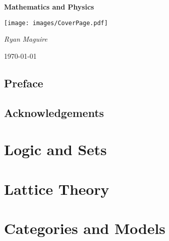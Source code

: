 \documentclass[oneside]{book}                                                  %
\newcommand*{\TOPPATH}{books}
\newcommand*{\PATH}{\TOPPATH/}
\newcounter{endpage}
\begin{document}
    \pagecolor{CoverPage}
    \begin{titlepage}
        \centering
        {\LARGE\bfseries{Mathematics and Physics}\par}
        \vspace{3.5cm}
        \texttt{[image: images/CoverPage.pdf]}
        \par\vspace{3cm}
        {\Large\itshape{Ryan Maguire}\par}
        \vfill
        {\large\today\par}
    \end{titlepage}
    \nopagecolor
    \tableofcontents
    \listoffigures
    \listoftables
    \clearpage
    \chapter*{Preface}
        
    \clearpage
    \chapter*{Acknowledgements}
        
    \clearpage

        \label{book:Foundations}
        \renewcommand{\PATH}{\TOPPATH/Foundations}
        \part{Logic and Sets}
            
        \part{Lattice Theory}
            
        \part{Categories and Models}
            
    \clearpage

    \setcounter{endpage}{\thepage}
        \label{book:Algebra}%
        \renewcommand{\PATH}{\TOPPATH/Algebra}
        \setcounter{page}{\value{endpage}}
\end{document}
